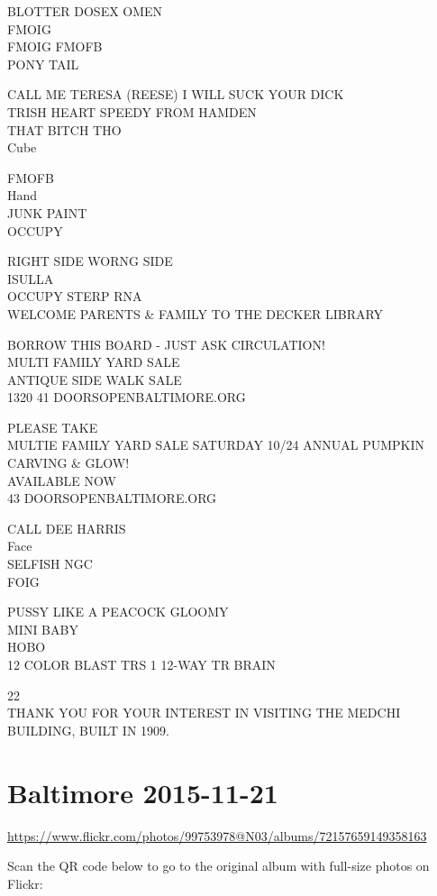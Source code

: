 \documentclass[10pt,letterpaper]{article}
\begin{document}
BLOTTER DOSEX OMEN\\
FMOIG\\
FMOIG FMOFB\\
PONY TAIL

CALL ME TERESA (REESE) I WILL SUCK YOUR DICK\\
TRISH HEART SPEEDY FROM HAMDEN\\
THAT BITCH THO\\
Cube

FMOFB\\
Hand\\
JUNK PAINT\\
OCCUPY

RIGHT SIDE WORNG SIDE\\
ISULLA\\
OCCUPY STERP RNA\\
WELCOME PARENTS \& FAMILY TO THE DECKER LIBRARY

BORROW THIS BOARD {-} JUST ASK CIRCULATION!\\
MULTI FAMILY YARD SALE\\
ANTIQUE SIDE WALK SALE\\
1320 41 DOORSOPENBALTIMORE.ORG

PLEASE TAKE\\
MULTIE FAMILY YARD SALE SATURDAY 10/24 ANNUAL PUMPKIN CARVING \& GLOW!\\
AVAILABLE NOW\\
43 DOORSOPENBALTIMORE.ORG

CALL DEE HARRIS\\
Face\\
SELFISH NGC\\
FOIG

PUSSY LIKE A PEACOCK GLOOMY\\
MINI BABY\\
HOBO\\
12 COLOR BLAST TRS 1 12{-}WAY TR BRAIN

22\\
THANK YOU FOR YOUR INTEREST IN VISITING THE MEDCHI BUILDING, BUILT IN 1909.


\section*{Baltimore 2015-11-21}

\url{https://www.flickr.com/photos/99753978@N03/albums/72157659149358163}

Scan the QR code below to go to the original album with full-size photos on Flickr:
\end{document}
